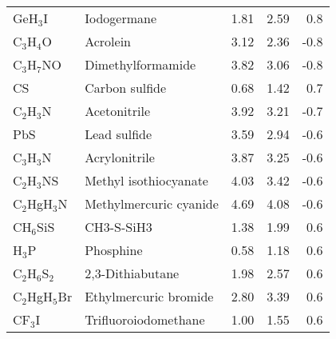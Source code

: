 \begin{table}
\begin{center}
\begin{tabular}{llrrr}
 GeH$_3$I             & Iodogermane                            &    1.81   &     2.59   &    0.8\\
 C$_3$H$_4$O          & Acrolein                               &    3.12   &     2.36   &   -0.8\\
 C$_3$H$_7$NO         & Dimethylformamide                      &    3.82   &     3.06   &   -0.8\\
 CS                   & Carbon sulfide                         &    0.68   &     1.42   &    0.7\\
 C$_2$H$_3$N          & Acetonitrile                           &    3.92   &     3.21   &   -0.7\\
 PbS                  & Lead sulfide                           &    3.59   &     2.94   &   -0.6\\
 C$_3$H$_3$N          & Acrylonitrile                          &    3.87   &     3.25   &   -0.6\\
 C$_2$H$_3$NS         & Methyl isothiocyanate                  &    4.03   &     3.42   &   -0.6\\
 C$_2$HgH$_3$N        & Methylmercuric cyanide                 &    4.69   &     4.08   &   -0.6\\
 CH$_6$SiS            & CH3-S-SiH3                             &    1.38   &     1.99   &    0.6\\
 H$_3$P               & Phosphine                              &    0.58   &     1.18   &    0.6\\
 C$_2$H$_6$S$_2$      & 2,3-Dithiabutane                       &    1.98   &     2.57   &    0.6\\
 C$_2$HgH$_5$Br       & Ethylmercuric bromide                  &    2.80   &     3.39   &    0.6\\
 CF$_3$I              & Trifluoroiodomethane                   &    1.00   &     1.55   &    0.6\\
\end{tabular}
\end{center}
\end{table}
